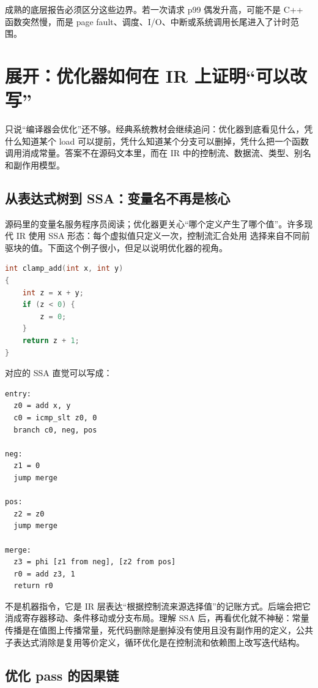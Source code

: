 成熟的底层报告必须区分这些边界。若一次请求 p99 偶发升高，可能不是 C++ 函数突然慢，而是 page fault、调度、I/O、中断或系统调用长尾进入了计时范围。

\section{展开：优化器如何在 IR 上证明“可以改写”}

只说“编译器会优化”还不够。经典系统教材会继续追问：优化器到底看见什么，凭什么知道某个 load 可以提前，凭什么知道某个分支可以删掉，凭什么把一个函数调用消成常量。答案不在源码文本里，而在 IR 中的控制流、数据流、类型、别名和副作用模型。

\subsection{从表达式树到 SSA：变量名不再是核心}

源码里的变量名服务程序员阅读；优化器更关心“哪个定义产生了哪个值”。许多现代 IR 使用 SSA 形态：每个虚拟值只定义一次，控制流汇合处用  选择来自不同前驱块的值。下面这个例子很小，但足以说明优化器的视角。

\begin{lstlisting}[language=C++,caption={源码中的变量会反复赋值}]
int clamp_add(int x, int y)
{
    int z = x + y;
    if (z < 0) {
        z = 0;
    }
    return z + 1;
}
\end{lstlisting}

对应的 SSA 直觉可以写成：

\begin{lstlisting}[numbers=none,caption={SSA 形态关注定义和控制流}]
entry:
  z0 = add x, y
  c0 = icmp_slt z0, 0
  branch c0, neg, pos

neg:
  z1 = 0
  jump merge

pos:
  z2 = z0
  jump merge

merge:
  z3 = phi [z1 from neg], [z2 from pos]
  r0 = add z3, 1
  return r0
\end{lstlisting}

 不是机器指令，它是 IR 层表达“根据控制流来源选择值”的记账方式。后端会把它消成寄存器移动、条件移动或分支布局。理解 SSA 后，再看优化就不神秘：常量传播是在值图上传播常量，死代码删除是删掉没有使用且没有副作用的定义，公共子表达式消除是复用等价定义，循环优化是在控制流和依赖图上改写迭代结构。

\subsection{优化 pass 的因果链}

